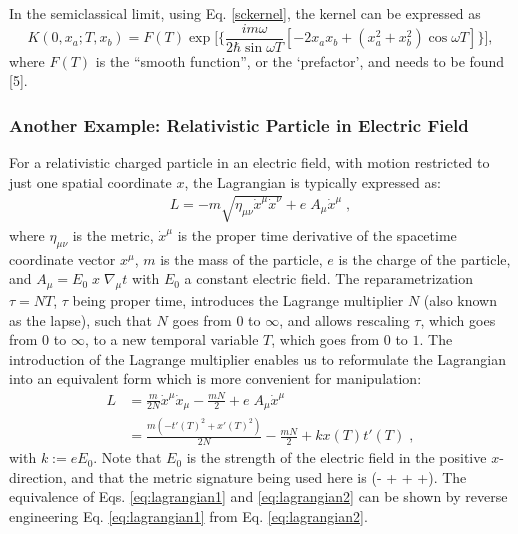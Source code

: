 \documentclass[12pt]{revtex4}
\begin{document}
In the semiclassical limit, using Eq. \ref{sckernel}, the kernel can be expressed as 
\[ K(0,x_a;T,x_b)=F(T) \exp \Bigg[{\Bigg\{\frac{im\omega}{2 \hbar \sin\omega T} [-2 x_a x_b + (x_a^2 + x_b^2) \cos \omega T]\Bigg\}}\Bigg],\]
where $F(T)$ is the ``smooth function'', or the `prefactor', and needs to be found [5]. 

\subsubsection{Another Example: Relativistic Particle in Electric Field}
For a relativistic charged particle in an electric field, with motion restricted to just one spatial coordinate $x$, the Lagrangian is typically expressed as:
\begin{align} \label{eq:lagrangian1}
L = - m \sqrt{\eta_{\mu \nu} \dot{x}^{\mu} \dot{x}^{\nu} } + e \; A_\mu \dot{x}^{\mu} \;,
\end{align}
where $\eta_{\mu \nu}$ is the metric, $\dot{x}^{\mu}$ is the proper time derivative of the spacetime coordinate vector $x^{\mu}$, $m$ is the mass of the particle, $e$ is the charge of the particle, and $A_\mu = E_0 \; x \; \nabla_\mu t$ with $E_0$ a constant electric field. The reparametrization $\tau = N T$, $\tau$ being proper time, introduces the Lagrange multiplier $N$ (also known as the lapse), such that $N$ goes from $0$ to $\infty$, and allows rescaling $\tau$, which goes from $0$ to $\infty$, to a new temporal variable $T$, which goes from $0$ to $1$. The introduction of the Lagrange multiplier enables us to reformulate the Lagrangian into an equivalent form which is more convenient for manipulation:
\begin{align} \label{eq:lagrangian2}
L &= \frac{m}{2N}\dot{x}^{\mu} \dot{x}_{\mu} -\frac{m N}{2} + e \; A_\mu \dot{x}^{\mu}  \\
 &= \frac{m (-t'(T)^2 + x'(T)^2)}{2N} -\frac{m N}{2} + k x(T) t'(T) \;,
\end{align}
with $k := e E_0$. Note that $E_0$ is the strength of the electric field in the positive $x$-direction, and that the metric signature being used here is (- + + +). The equivalence of Eqs. \ref{eq:lagrangian1} and \ref{eq:lagrangian2} can be shown by reverse engineering Eq. \ref{eq:lagrangian1} from Eq. \ref{eq:lagrangian2}. 
\end{document}
